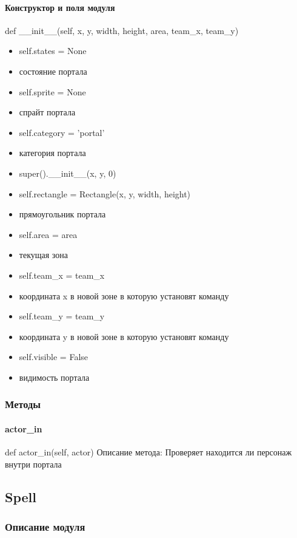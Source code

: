 \paragraph{Конструктор и поля модуля}
def \_\_init\_\_(self, x, y, width, height, area, team\_x, team\_y)
\begin{itemize}
	\item self.states = None
	\item состояние портала
	\item self.sprite = None
	\item спрайт портала
	\item self.category = 'portal'
	\item категория портала
	\item super().\_\_init\_\_(x, y, 0)
	\item self.rectangle = Rectangle(x, y, width, height)
	\item прямоугольник портала
	\item self.area = area
	\item текущая зона
	\item self.team\_x = team\_x
	\item координата x в новой зоне в которую установят команду
	\item self.team\_y = team\_y
	\item координата y в новой зоне в которую установят команду
	\item self.visible = False
	\item видимость портала
\end{itemize}
\subsubsection{Методы}
\paragraph{actor\_in}
def actor\_in(self, actor)
Описание метода: Проверяет находится ли персонаж внутри портала

\subsection{Spell}
\subsubsection{Описание модуля}
